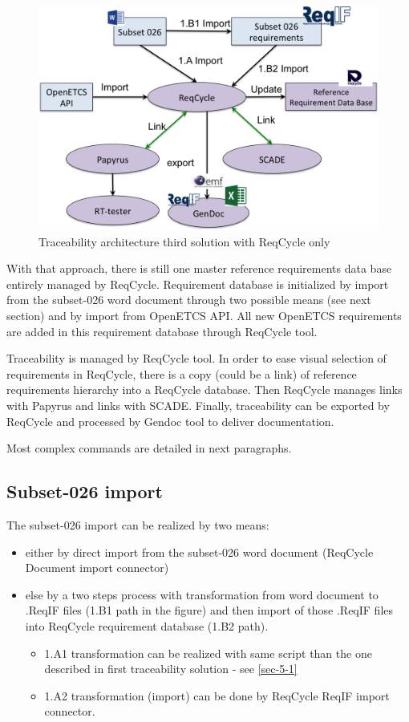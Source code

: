 \documentclass[11pt]{template/openetcs_report}
\begin{document}
\begin{figure}[htb]
\centering
\includegraphics[width=.9\linewidth]{images/Third-Solution-ReqCycle.png}
\caption{\label{fig:trace_third}Traceability architecture third solution with ReqCycle only}
\end{figure}

With that approach, there is still one master reference requirements data base entirely managed by ReqCycle. Requirement database is initialized by import from the subset-026 word document through two possible means (see next section) and by import from OpenETCS API.
All new OpenETCS requirements are added in this requirement database through ReqCycle tool.

Traceability is managed by ReqCycle tool. In order to ease visual selection of requirements in ReqCycle, there is a copy (could be a link) of reference requirements hierarchy into a ReqCycle database. Then ReqCycle manages links with Papyrus and links with SCADE. 
Finally, traceability can be exported by ReqCycle and processed by Gendoc tool to deliver documentation.

Most complex commands are detailed in next paragraphs.


\subsection{Subset-026 import}
\label{sec-7-1}
The subset-026 import can be realized by two means:
\begin{itemize}
\item either by direct import from the subset-026 word document (ReqCycle Document import connector)
\item else by a two steps process with transformation from word document to .ReqIF files (1.B1 path in the figure) and then import of those .ReqIF files into ReqCycle requirement database (1.B2 path).
	\begin{itemize}

	\item 1.A1 transformation can be realized with same script than the one described in first traceability solution - see \ref{sec-5-1}

	\item 1.A2 transformation (import) can be done by ReqCycle ReqIF import connector.
	\end{itemize}
\end{itemize}
\end{document}
